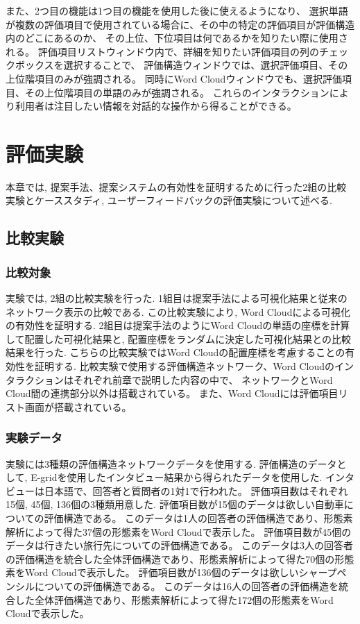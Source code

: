 \documentclass[syuuron]{kuee}
\begin{document}
			また、2つ目の機能は1つ目の機能を使用した後に使えるようになり、
			選択単語が複数の評価項目で使用されている場合に、その中の特定の評価項目が評価構造内のどこにあるのか、
			その上位、下位項目は何であるかを知りたい際に使用される。
			評価項目リストウィンドウ内で、詳細を知りたい評価項目の列のチェックボックスを選択することで、
			評価構造ウィンドウでは、選択評価項目、その上位階項目のみが強調される。
			同時にWord Cloudウィンドウでも、選択評価項目、その上位階項目の単語のみが強調される。
			これらのインタラクションにより利用者は注目したい情報を対話的な操作から得ることができる。
			

\chapter{評価実験}
	本章では, 提案手法、提案システムの有効性を証明するために行った2組の比較実験とケーススタディ, ユーザーフィードバックの評価実験について述べる. 
	\section{比較実験}
		\subsection{比較対象}
			実験では, 2組の比較実験を行った. 
			1組目は提案手法による可視化結果と従来のネットワーク表示の比較である. 
			この比較実験により, Word Cloudによる可視化の有効性を証明する. 
			2組目は提案手法のようにWord Cloudの単語の座標を計算して配置した可視化結果と, 配置座標をランダムに決定した可視化結果との比較結果を行った. 
			こちらの比較実験ではWord Cloudの配置座標を考慮することの有効性を証明する. 
			比較実験で使用する評価構造ネットワーク、Word Cloudのインタラクションはそれぞれ前章で説明した内容の中で、
			ネットワークとWord Cloud間の連携部分以外は搭載されている。
			また、Word Cloudには評価項目リスト画面が搭載されている。
			
		\subsection{実験データ}
			実験には3種類の評価構造ネットワークデータを使用する. 
			評価構造のデータとして, E-gridを使用したインタビュー結果から得られたデータを使用した.
			インタビューは日本語で、回答者と質問者の1対1で行われた。
			評価項目数はそれぞれ15個, 45個, 136個の3種類用意した. 
			評価項目数が15個のデータは欲しい自動車についての評価構造である。
			このデータは1人の回答者の評価構造であり、形態素解析によって得た37個の形態素をWord Cloudで表示した。
			評価項目数が45個のデータは行きたい旅行先についての評価構造である。
			このデータは3人の回答者の評価構造を統合した全体評価構造であり、形態素解析によって得た70個の形態素をWord Cloudで表示した。
			評価項目数が136個のデータは欲しいシャープペンシルについての評価構造である。
			このデータは16人の回答者の評価構造を統合した全体評価構造であり、形態素解析によって得た172個の形態素をWord Cloudで表示した。
		
\end{document}
